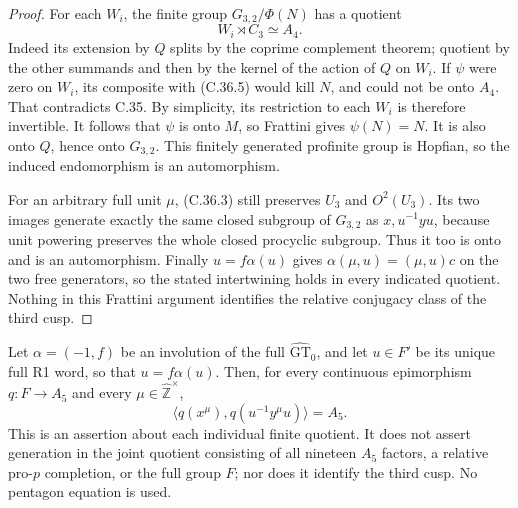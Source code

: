 \begin{proof}
For each \(W_i\), the finite group
\(G_{3,2}/\Phi(N)\) has a quotient
\[
                        W_i\rtimes C_3\simeq A_4.
 \tag{C.36.5}
\]
Indeed its extension by \(Q\) splits by the coprime
complement theorem; quotient by the other summands and then
by the kernel of the action of \(Q\) on \(W_i\).
If \(\psi\) were zero on \(W_i\), its composite with
(C.36.5) would kill \(N\), and could not be onto \(A_4\).
That contradicts C.35. By simplicity, its restriction to
each \(W_i\) is therefore invertible. It follows that
\(\psi\) is onto \(M\), so Frattini gives
\(\psi(N)=N\). It is also onto \(Q\), hence onto
\(G_{3,2}\). This finitely generated profinite group is
Hopfian, so the induced endomorphism is an automorphism.

For an arbitrary full unit \(\mu\), (C.36.3) still
preserves \(U_3\) and \(O^2(U_3)\). Its two images
generate exactly the same closed subgroup of \(G_{3,2}\)
as \(x,u^{-1}yu\), because unit powering preserves the
whole closed procyclic subgroup. Thus it too is onto and
is an automorphism. Finally \(u=f\alpha(u)\) gives
\(\alpha(\mu,u)=(\mu,u)c\) on the two free generators,
so the stated intertwining holds in every indicated quotient.
Nothing in this Frattini argument identifies the relative
conjugacy class of the third cusp.
\end{proof}

Let \(\alpha=(-1,f)\) be an involution of the full
\(\widehat{\mathrm{GT}}_0\), and let \(u\in F'\) be its
unique full R1 word, so that \(u=f\alpha(u)\). Then, for
every continuous epimorphism \(q:F\to A_5\) and every
\(\mu\in\widehat{\mathbb Z}^{\times}\),
\[
 \bigl\langle q(x^\mu),q(u^{-1}y^\mu u)\bigr\rangle=A_5.
 \tag{C.37.1}
\]
This is an assertion about each individual finite quotient. It does
not assert generation in the joint quotient consisting of all
nineteen \(A_5\) factors, a relative pro-\(p\) completion,
or the full group \(F\); nor does it identify the third cusp.
No pentagon equation is used.

